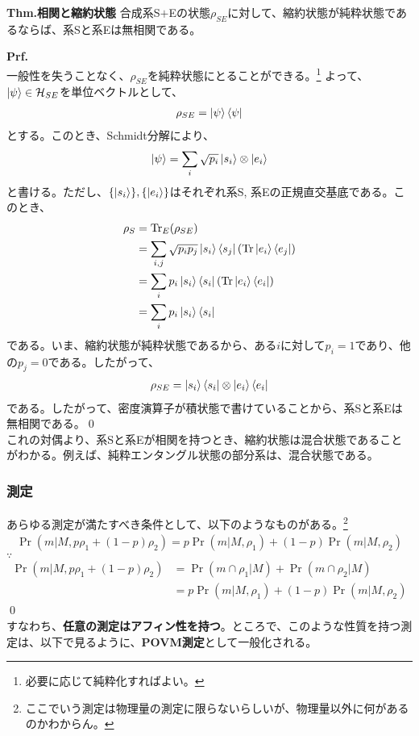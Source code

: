 \documentclass[a4paper,11pt]{jsarticle}
\numberwithin{equation}{section}
\begin{document}
\begin{itembox}[l]{\textbf{Thm.相関と縮約状態}}
    合成系S$+$Eの状態$\rho_{SE}$に対して、縮約状態が純粋状態であるならば、系Sと系Eは無相関である。
\end{itembox}
\textbf{Prf.}\\
一般性を失うことなく、$\rho_{SE}$を純粋状態にとることができる。\footnote{必要に応じて純粋化すればよい。}
よって、$\ket{\psi}\in \mathcal{H}_{SE}$を単位ベクトルとして、
\begin{align}
    \rho_{SE} = \ket{\psi}\bra{\psi}
\end{align}
とする。このとき、Schmidt分解により、
\begin{align}
    \ket{\psi} = \sum_i \sqrt{p_i}\ket{s_i}\otimes\ket{e_i}
\end{align}
と書ける。ただし、$\{\ket{s_i}\}, \{\ket{e_i}\}$はそれぞれ系S, 系Eの正規直交基底である。このとき、
\begin{align}
    \rho_{S} &= \Tr_E(\rho_{SE})\\
    &= \sum_{i,j} \sqrt{p_ip_j}\ket{s_i}\bra{s_j}(\Tr\ket{e_i}\bra{e_j})\\
    &= \sum_i p_i\ket{s_i}\bra{s_i}(\Tr\ket{e_i}\bra{e_i})\\
    &= \sum_i p_i\ket{s_i}\bra{s_i}
\end{align}
である。いま、縮約状態が純粋状態であるから、ある$i$に対して$p_i = 1$であり、他の$p_j = 0$である。したがって、
\begin{align}
    \rho_{SE} = \ket{s_i}\bra{s_i}\otimes\ket{e_i}\bra{e_i}
\end{align}
である。したがって、密度演算子が積状態で書けていることから、系Sと系Eは無相関である。\qed\\

これの対偶より、系Sと系Eが相関を持つとき、縮約状態は混合状態であることがわかる。例えば、純粋エンタングル状態の部分系は、混合状態である。\\

\subsubsection{測定}
あらゆる測定が満たすべき条件として、以下のようなものがある。\footnote{ここでいう測定は物理量の測定に限らないらしいが、物理量以外に何があるのかわからん。}
\begin{align}
    \Pr(m | M, p\rho_1 + (1-p)\rho_2) = p\Pr(m | M, \rho_1) + (1-p)\Pr(m | M, \rho_2)
\end{align}
$\because$
\begin{align}
    \Pr(m | M, p\rho_1 + (1-p)\rho_2) &= \Pr(m \cap \rho_1| M) + \Pr(m \cap \rho_2| M)\\
    &= p\Pr(m | M, \rho_1) + (1-p)\Pr(m | M, \rho_2)
\end{align} 
\qed\\
すなわち、\textbf{任意の測定はアフィン性を持つ}。ところで、このような性質を持つ測定は、以下で見るように、\textbf{POVM測定}として一般化される。
\end{document}
